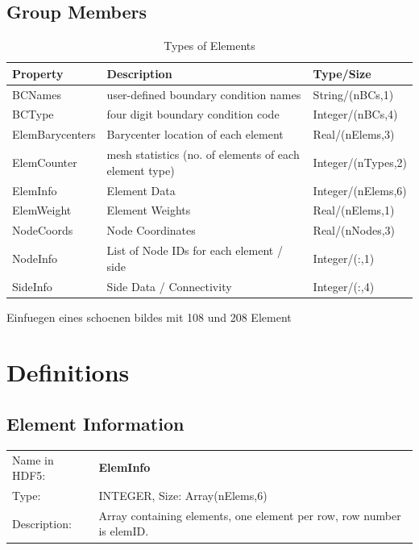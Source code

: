 \subsection{Group Members}
\begin{table}[h!]
\centering
\begin{tabularx}{1.0\textwidth}{|l|X|l|} \hline
Property      & Description                                             & Type/Size          \\ \hline
BCNames       & user-defined boundary condition names                   & String/(nBCs,1)     \\
BCType        & four digit boundary condition code  & Integer/(nBCs,4)   \\ 
ElemBarycenters   & Barycenter location of each element  & Real/(nElems,3)  \\
ElemCounter   & mesh statistics (no. of elements of each element type)  & Integer/(nTypes,2)  \\
ElemInfo      & Element Data                                             & Integer/(nElems,6)  \\
ElemWeight    & Element Weights                                         & Real/(nElems,1)    \\ 
NodeCoords    & Node Coordinates                                        & Real/(nNodes,3)  \\
NodeInfo      & List of Node IDs for each element / side                & Integer/(:,1)       \\ 
SideInfo      & Side Data / Connectivity                                & Integer/(:,4)       \\ \hline
\end{tabularx}
\caption{Types of Elements}
\end{table}

Einfuegen eines schoenen bildes mit 108 und 208 Element
\section{Definitions}
\subsection{Element Information}

\begin{table}[h!]
\begin{tabularx}{1.0\textwidth}{lX}
Name in HDF5: & \textbf{ElemInfo} \\
Type:         & INTEGER, Size: Array(nElems,6) \\
Description:  & Array containing elements, one element per row, row number is elemID. \\
\end{tabularx}
\end{table}

